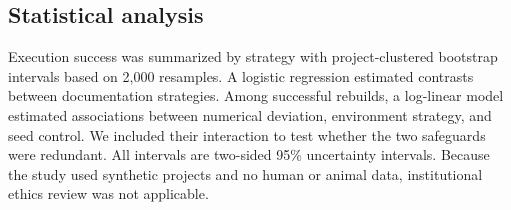\subsection{Statistical analysis}

Execution success was summarized by strategy with project-clustered bootstrap
intervals based on 2,000 resamples. A logistic regression estimated contrasts
between documentation strategies. Among successful rebuilds, a log-linear model
estimated associations between numerical deviation, environment strategy, and
seed control. We included their interaction to test whether the two safeguards
were redundant. All intervals are two-sided 95\% uncertainty intervals. Because
the study used synthetic projects and no human or animal data, institutional
ethics review was not applicable.
